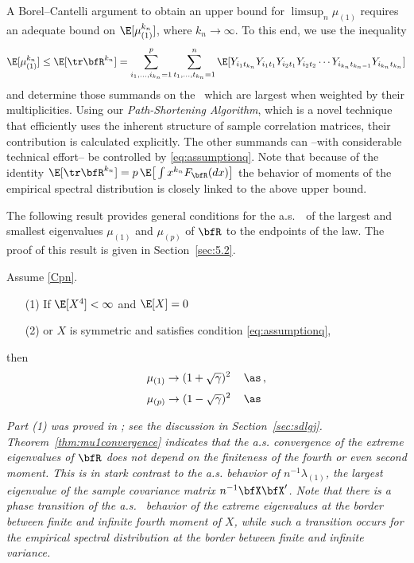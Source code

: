 A Borel--Cantelli argument to obtain an upper bound for $\limsup_n \mu_{(1)}$ requires an adequate bound on $\E[\mu_{(1)}^{k_n}]$, where $k_n\to \infty$. To this end, we use the inequality
\begin{equation*}
\E[\mu_{(1)}^{k_n}]\le \E[\tr \bfR^{k_n}] %
= \sum_{i_1,\ldots,i_{k_n}=1}^p \sum_{t_1,\ldots,t_{k_n}=1}^n \E[ Y_{i_1t_{k_n}} Y_{i_1t_1} Y_{i_2t_1}Y_{i_2t_2} \cdots Y_{i_{k_n}t_{{k_n}-1}} Y_{i_{k_n}t_{k_n}}  ]
\end{equation*}
and determine those summands on the \rhs~which are largest when weighted by their multiplicities. Using our {\em Path-Shortening Algorithm}, which is a novel technique that efficiently uses the inherent structure of sample correlation matrices, their contribution is calculated explicitly. The other summands can --with considerable technical effort-- be controlled by \eqref{eq:assumptionq}. 
Note that because of the identity $\E[\tr \bfR^{k_n}] =p\, \E\big[\int x^{k_n} F_{\bfR}(dx)\big]$ the behavior of moments of the empirical spectral distribution is closely linked to the above upper bound.

The following result provides general conditions for the a.s.~\con\ of 
the largest and smallest eigenvalues $\mu_{(1)}$ and $\mu_{(p)}$ of $\bfR$ to the endpoints of the 
\MP law. The proof of this result is given in Section~\ref{sec:5.2}.
\begin{theorem}\label{thm:mu1convergence}
Assume \eqref{Cpn}. 
\begin{itemize}
\item[(1)] If $\E[X^4]<\infty$ and $\E[X]=0$ 
\item[(2)] or $X$ is symmetric and satisfies condition \eqref{eq:assumptionq},
\end{itemize}
then 
\begin{equation}\label{eq:mlmgd}
{\mu}_{(1)} \to (1+\sqrt{\gamma})^2 \, \quad \as\,,
\end{equation}
\begin{equation}\label{eq:limitmup}
{\mu}_{(p)} \to (1-\sqrt{\gamma})^2 \, \quad \as\phantom{\,,}
\end{equation}
\end{theorem}
\begin{remark}{\em Part (1) was proved in \cite{jiang:2004,xiao:zhou:2010}; see the discussion
in Section~\ref{sec:sdlgj}. 
Theorem~\ref{thm:mu1convergence} indicates that the a.s. convergence of the extreme eigenvalues of $\bfR$
does not depend on the finiteness of the fourth or even second moment. 
This is in stark contrast to the a.s. behavior of $n^{-1}\lambda_{(1)}$, the largest eigenvalue of the sample covariance matrix 
$n^{-1}\bfX\bfX'$. Note that there is a phase transition of the a.s. \asy\ behavior of the  
extreme eigenvalues at the border between finite and infinite fourth moment of $X$, 
while such a transition occurs for the empirical spectral distribution at the border between finite and infinite variance.}
\end{remark}
